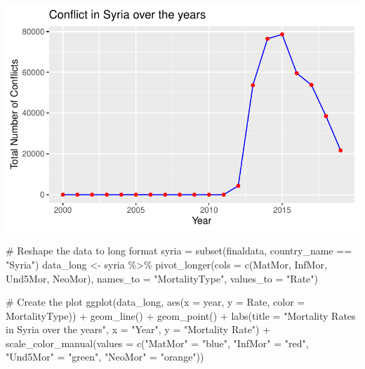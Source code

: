 \documentclass[
  11pt,
  letterpaper,
  DIV=11,
  numbers=noendperiod]{scrartcl}
\newenvironment{Shaded}{\begin{snugshade}}{\end{snugshade}}
\newcommand{\AttributeTok}[1]{\textcolor[rgb]{0.40,0.45,0.13}{#1}}
\newcommand{\CommentTok}[1]{\textcolor[rgb]{0.37,0.37,0.37}{#1}}
\newcommand{\FunctionTok}[1]{\textcolor[rgb]{0.28,0.35,0.67}{#1}}
\newcommand{\NormalTok}[1]{\textcolor[rgb]{0.00,0.23,0.31}{#1}}
\newcommand{\OtherTok}[1]{\textcolor[rgb]{0.00,0.23,0.31}{#1}}
\newcommand{\SpecialCharTok}[1]{\textcolor[rgb]{0.37,0.37,0.37}{#1}}
\newcommand{\StringTok}[1]{\textcolor[rgb]{0.13,0.47,0.30}{#1}}
\begin{document}
\includegraphics{armed_conflict_eda_files/figure-pdf/unnamed-chunk-7-1.pdf}

\begin{Shaded}
\begin{Highlighting}[]
\CommentTok{\# Reshape the data to long format}
\NormalTok{syria }\OtherTok{=} \FunctionTok{subset}\NormalTok{(finaldata, country\_name }\SpecialCharTok{==} \StringTok{"Syria"}\NormalTok{)}
\NormalTok{data\_long }\OtherTok{\textless{}{-}}\NormalTok{ syria }\SpecialCharTok{\%\textgreater{}\%}
  \FunctionTok{pivot\_longer}\NormalTok{(}\AttributeTok{cols =} \FunctionTok{c}\NormalTok{(MatMor, InfMor, Und5Mor, NeoMor), }
               \AttributeTok{names\_to =} \StringTok{"MortalityType"}\NormalTok{, }
               \AttributeTok{values\_to =} \StringTok{"Rate"}\NormalTok{)}

\CommentTok{\# Create the plot}
\FunctionTok{ggplot}\NormalTok{(data\_long, }\FunctionTok{aes}\NormalTok{(}\AttributeTok{x =}\NormalTok{ year, }\AttributeTok{y =}\NormalTok{ Rate, }\AttributeTok{color =}\NormalTok{ MortalityType)) }\SpecialCharTok{+}
      \FunctionTok{geom\_line}\NormalTok{() }\SpecialCharTok{+}
      \FunctionTok{geom\_point}\NormalTok{() }\SpecialCharTok{+} 
      \FunctionTok{labs}\NormalTok{(}\AttributeTok{title =} \StringTok{"Mortality Rates in Syria over the years"}\NormalTok{, }
           \AttributeTok{x =} \StringTok{"Year"}\NormalTok{, }
           \AttributeTok{y =} \StringTok{"Mortality Rate"}\NormalTok{) }\SpecialCharTok{+}
      \FunctionTok{scale\_color\_manual}\NormalTok{(}\AttributeTok{values =} \FunctionTok{c}\NormalTok{(}\StringTok{"MatMor"} \OtherTok{=} \StringTok{"blue"}\NormalTok{, }
                                      \StringTok{"InfMor"} \OtherTok{=} \StringTok{"red"}\NormalTok{, }
                                      \StringTok{"Und5Mor"} \OtherTok{=} \StringTok{"green"}\NormalTok{, }
                                      \StringTok{"NeoMor"} \OtherTok{=} \StringTok{"orange"}\NormalTok{))}
\end{Highlighting}
\end{Shaded}
\end{document}
